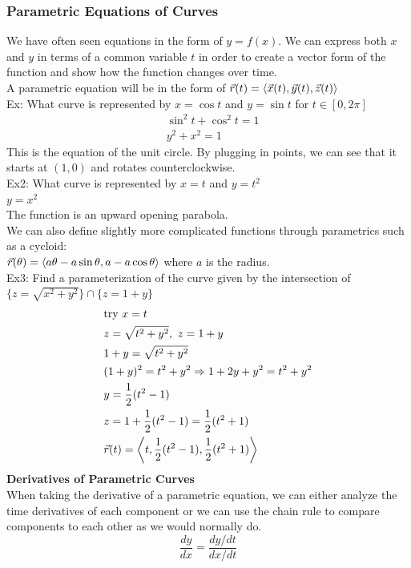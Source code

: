 \documentclass[11pt, fleqn]{article}
\begin{document}
\subsubsection{Parametric Equations of Curves}
We have often seen equations in the form of $y=f(x)$. We can express both $x$ and $y$ in terms of a common variable $t$ in order to create a vector form of the function and show how the function changes over time.\\
A parametric equation will be in the form of $\vec{r}(t)=\left\langle \vec{x}(t),\vec{y}(t),\vec{z}(t) \right\rangle$\\
Ex: What curve is represented by $x=\cos t$ and $y=\sin t$ for $t\in[0,2\pi]$
\begin{align*}
    &\sin^2t+\cos^2t=1\\
    &y^2+x^2=1
\end{align*}
This is the equation of the unit circle. By plugging in points, we can see that it starts at $(1,0)$ and rotates counterclockwise.\\
Ex2: What curve is represented by $x=t$ and $y=t^2$\\
$y=x^2$\\
The function is an upward opening parabola.\\
We can also define slightly more complicated functions through parametrics such as a cycloid:\\
$\vec{r}(\theta)=\left\langle a\theta-a\sin\theta,a-a\cos\theta \right\rangle$ where $a$ is the radius.\\
Ex3: Find a parameterization of the curve given by the intersection of $\{z=\sqrt{x^2+y^2}\}\cap\{z=1+y\}$\\
\begin{align*}
    &\text{try }x=t\\
    &z=\sqrt{t^2+y^2},\ z=1+y\\
    &1+y=\sqrt{t^2+y^2}\\
    &(1+y)^2=t^2+y^2\Rightarrow 1+2y+y^2=t^2+y^2\\
    &y=\frac{1}{2}(t^2-1)\\
    &z=1+\frac{1}{2}(t^2-1)=\frac{1}{2}(t^2+1)\\
    &\vec{r}(t)=\left\langle t,\frac{1}{2}(t^2-1),\frac{1}{2}(t^2+1) \right\rangle
\end{align*}
\textbf{Derivatives of Parametric Curves}\\
When taking the derivative of a parametric equation, we can either analyze the time derivatives of each component or we can use the chain rule to compare components to each other as we would normally do.
$$\frac{dy}{dx}=\frac{dy/dt}{dx/dt}$$
\end{document}
